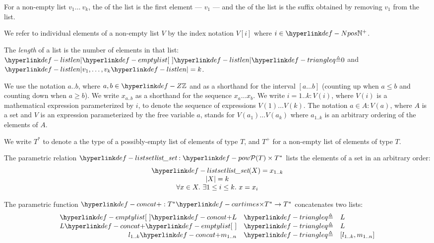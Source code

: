 \hypertarget{def-head}{}
\hypertarget{def-tail}{}
For a non-empty list $v_1 \ldots\ v_k$, the \emph{\head} of the list is the first element --- $v_1$ ---
and the \emph{\tail} of the list is the suffix obtained by removing $v_1$ from the list.

We refer to individual elements of a non-empty list $V$ by the index notation $V[i]$ where $i\in\Npos$.

\hypertarget{def-listlen}{}
\begin{definition}
The \emph{length} of a list is the number of elements in that list:
$\listlen{\emptylist} \triangleq 0$ and $\listlen{v_1,\ldots,v_k}=k$.
\end{definition}

We use the notation $a..b$, where $a,b\in\Z$ and as a shorthand for the interval $[a\ldots b]$
(counting up when $a \leq b$ and counting down when $a \geq b$).
We write $x_{a..b}$ as a shorthand for the sequence $x_a \ldots x_b$.
%
We write $i=1..k: V(i)$, where $V(i)$ is a mathematical expression parameterized by $i$,
to denote the sequence of expressions $V(1) \ldots V(k)$.
The notation $a \in A: V(a)$, where $A$ is a set and $V$ is an expression parameterized by the free variable $a$,
stands for $V(a_1) \ldots V(a_k)$ where $a_{1..k}$ is an arbitrary ordering of the elements of $A$.

We write $T^*$ to denote a the type of a possibly-empty list of elements of type $T$,
and $T^+$ for a non-empty list of elements of type $T$.

\hypertarget{def-listset}{}
\begin{definition}
The parametric relation $\listset : \pow{T} \times T^*$
lists the elements of a set in an arbitrary order:
\[
\begin{array}{c}
  \listset(X) = x_{1..k}\\
  |X| = k\\
  \forall x\in X.\ \exists 1 \leq i \leq k.\ x = x_i
\end{array}
\]
\end{definition}

\hypertarget{def-concat}{}
\begin{definition}
The parametric function $\concat : T^* \cartimes T^* \rightarrow T^*$ concatenates two lists:
\[
    \begin{array}{rcl}
    \emptylist \concat L &\triangleq& L\\
    L \concat \emptylist &\triangleq& L\\
    l_{1..k} \concat m_{1..n} &\triangleq& [l_{1..k}, m_{1..n}]
    \end{array}
\]
\end{definition}

